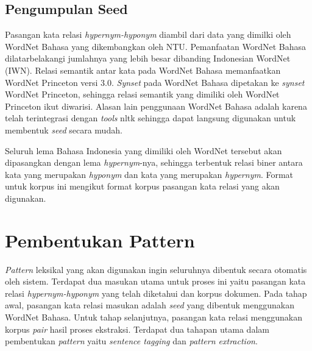 \subsection{Pengumpulan Seed}
Pasangan kata relasi \textit{hypernym-hyponym} diambil dari data yang dimilki oleh WordNet Bahasa yang dikembangkan oleh NTU. Pemanfaatan WordNet Bahasa dilatarbelakangi jumlahnya yang lebih besar dibanding Indonesian WordNet (IWN). Relasi semantik antar kata pada WordNet Bahasa memanfaatkan WordNet Princeton versi 3.0. \textit{Synset} pada WordNet Bahasa dipetakan ke \textit{synset} WordNet Princeton, sehingga relasi semantik yang dimiliki oleh WordNet Princeton ikut diwarisi. Alasan lain penggunaan WordNet Bahasa adalah karena telah terintegrasi dengan \textit{tools} nltk sehingga dapat langsung digunakan untuk membentuk \textit{seed} secara mudah.

Seluruh lema Bahasa Indonesia yang dimiliki oleh WordNet tersebut akan dipasangkan dengan lema \textit{hypernym}-nya, sehingga terbentuk relasi biner antara kata yang merupakan \textit{hyponym} dan kata yang merupakan \textit{hypernym}. Format untuk korpus ini mengikut format korpus pasangan kata relasi yang akan digunakan.


\section{Pembentukan Pattern}
\textit{Pattern} leksikal yang akan digunakan ingin seluruhnya dibentuk secara otomatis oleh sistem. Terdapat dua masukan utama untuk proses ini yaitu pasangan kata relasi \textit{hypernym-hyponym} yang telah diketahui dan korpus dokumen. Pada tahap awal, pasangan kata relasi masukan adalah \textit{seed} yang dibentuk menggunakan WordNet Bahasa. Untuk tahap selanjutnya, pasangan kata relasi menggunakan korpus \textit{pair} hasil proses ekstraksi. Terdapat dua tahapan utama dalam pembentukan \textit{pattern} yaitu \textit{sentence tagging} dan \textit{pattern extraction}.

